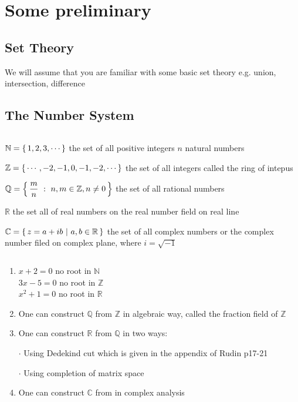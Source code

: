 

\section{Some preliminary}

\subsection{Set Theory}

We will assume that you are familiar with some basic set theory e.g. union, intersection, difference

\subsection{The Number System} $ $ 

$\mathbb{N}=\left\{ \,1,2,3,\cdots \,\right\}$ the set of all positive integers $n$ natural numbers

$\mathbb{Z}=\left\{ \,\cdots,-2,-1,0,-1,-2,\cdots \,\right\}$ the set of all integers called the ring of intepus

$\mathbb{Q} = \left\{ \,\dfrac{m}{n}~:~n,m \in \mathbb{Z},n\neq 0 \,\right\}$ the set of all rational numbers %

$\mathbb{R}$ the set all of real numbers on the real number field on real line

$\mathbb{C} = \left\{ \,z=a+ib~|~a,b\in\mathbb{R} \,\right\}$ the set of all complex numbers or the complex number filed on complex plane, where $i = \sqrt{-1}$

 \begin{rmk*}$ $
 	\begin{tcolorbox}
 		\begin{enumerate}
 		\item $x + 2 = 0$ no root in $\mathbb{N}$\\$3x - 5 = 0$ no root in $\mathbb{Z}$\\$x^2 + 1 = 0$ no root in $\mathbb{R}$
 		\item One can construct $\mathbb{Q}$ from $\mathbb{Z}$ in algebraic way, called the fraction field of $\mathbb{Z}$
 		\item One can construct $\mathbb{R}$ from $\mathbb{Q}$ in two ways:
 		
 		$\cdot$ Using Dedekind cut which is given in the appendix of Rudin p17-21
 		
 		$\cdot$ Using completion of matrix space
 		\item One can construct $\mathbb{C}$ from in complex analysis
 	\end{enumerate}
 	\end{tcolorbox}
 	
 \end{rmk*}
 
